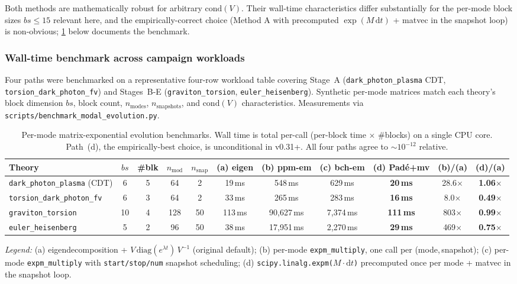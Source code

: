 Both methods are mathematically robust for arbitrary $\mathrm{cond}(V)$. Their wall-time characteristics differ substantially for the per-mode block sizes $bs \le 15$ relevant here, and the empirically-correct choice (Method A with precomputed $\exp(M\,\mathrm{d}t)$ + matvec in the snapshot loop) is non-obvious; \cref{tab:modal-expm-benchmark} below documents the benchmark.

\subsubsection{Wall-time benchmark across campaign workloads}
\label{sec:modal-expm-benchmark}

Four paths were benchmarked on a representative four-row workload table covering Stage~A (\texttt{dark\_photon\_plasma} CDT, \texttt{torsion\_dark\_photon\_fv}) and Stages~B-E (\texttt{graviton\_torsion}, \texttt{euler\_heisenberg}). Synthetic per-mode matrices match each theory's block dimension $bs$, block count, $n_\text{modes}$, $n_\text{snapshots}$, and $\mathrm{cond}(V)$ characteristics. Measurements via \texttt{scripts/benchmark\_modal\_evolution.py}.

\begin{table}[htbp]
\centering
\caption{Per-mode matrix-exponential evolution benchmarks. Wall time is total per-call (per-block time $\times$ \#blocks) on a single CPU core. Path~(d), the empirically-best choice, is unconditional in v0.31+. All four paths agree to $\sim10^{-12}$ relative.}
\label{tab:modal-expm-benchmark}
\setlength{\tabcolsep}{4pt}
\begin{tabular}{@{}lcccccccccc@{}}
\toprule
Theory & $bs$ & \#blk & $n_\text{mod}$ & $n_\text{snap}$ & (a) eigen & (b) ppm-em & (c) bch-em & (d) Pad\'{e}+mv & (b)/(a) & (d)/(a) \\
\midrule
\texttt{dark\_photon\_plasma} (CDT) & 6 & 5 & 64 & 2 & 19\,ms & 548\,ms & 629\,ms & \textbf{20\,ms} & 28.6$\times$ & \textbf{1.06$\times$} \\
\texttt{torsion\_dark\_photon\_fv} & 6 & 3 & 64 & 2 & 33\,ms & 265\,ms & 283\,ms & \textbf{16\,ms} & 8.0$\times$ & \textbf{0.49$\times$} \\
\texttt{graviton\_torsion} & 10 & 4 & 128 & 50 & 113\,ms & 90{,}627\,ms & 7{,}374\,ms & \textbf{111\,ms} & 803$\times$ & \textbf{0.99$\times$} \\
\texttt{euler\_heisenberg} & 5 & 2 & 96 & 50 & 38\,ms & 17{,}951\,ms & 2{,}270\,ms & \textbf{29\,ms} & 469$\times$ & \textbf{0.75$\times$} \\
\bottomrule
\end{tabular}

\smallskip
\textit{Legend:} (a) eigendecomposition + $V\,\mathrm{diag}(e^{\lambda t})\,V^{-1}$ (original default); (b) per-mode \texttt{expm\_multiply}, one call per (mode,\,snapshot); (c) per-mode \texttt{expm\_multiply} with \texttt{start/stop/num} snapshot scheduling; (d) \texttt{scipy.linalg.expm($M \cdot \mathrm{d}t$)} precomputed once per mode + matvec in the snapshot loop.
\end{table}

